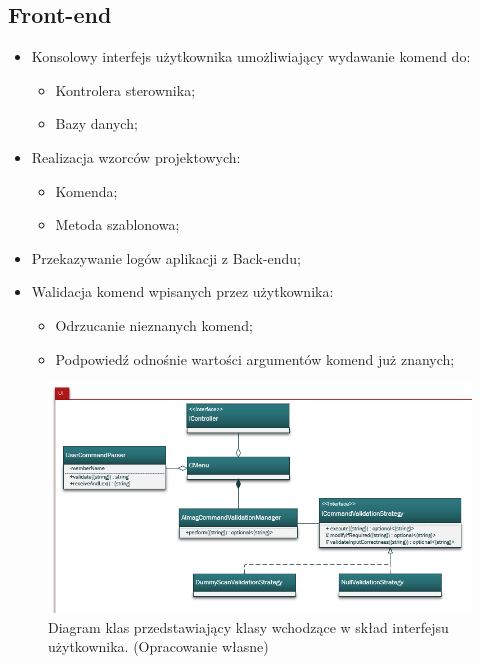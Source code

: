\subsection{Front-end}
\begin{itemize}
	\item Konsolowy interfejs użytkownika umożliwiający wydawanie komend do:
	\begin{itemize}
		\item Kontrolera sterownika;
		\item Bazy danych;
	\end{itemize}
	\item Realizacja wzorców projektowych:
	\begin{itemize}
		\item Komenda;
		\item Metoda szablonowa;
	\end{itemize}
	\item Przekazywanie logów aplikacji z Back-endu;
	\item Walidacja komend wpisanych przez użytkownika:
	\begin{itemize}
		\item Odrzucanie nieznanych komend;
		\item Podpowiedź odnośnie wartości argumentów komend już znanych;
	\end{itemize}
\end{itemize}

\begin{figure}[h!]
    \centering
    \includegraphics[scale=0.90]{Obrazki/DiagramyKlas/UI.png}
    \caption{Diagram klas przedstawiający klasy wchodzące w skład interfejsu użytkownika.
        \newline(Opracowanie własne)}
\end{figure}



